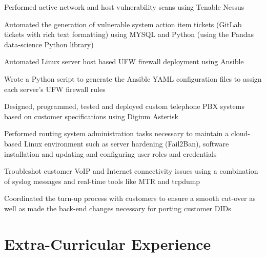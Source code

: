 \documentclass[letterpaper]{deedy-resume} %
\begin{document}
\begin{minipage}[t]{0.66\textwidth}
\sectionspace %



\begin{tightitemize}
\item Performed active network and host vulnerability scans using Tenable Nessus
\item Automated the generation of vulnerable system action item tickets (GitLab tickets with rich text formatting) using MYSQL and Python (using the Pandas data-science Python library)
\item Automated Linux server host based UFW firewall deployment using Ansible
\item Wrote a Python script to generate the Ansible YAML configuration files to assign each server’s UFW firewall rules
\end{tightitemize}

\sectionspace %


\begin{tightitemize}
	\item Designed, programmed, tested and deployed custom telephone PBX systems based on customer specifications using Digium Asterisk
	\item Performed routing system administration tasks necessary to maintain a cloud-based Linux environment such as server hardening (Fail2Ban), software installation and updating and configuring user roles and credentials 
	\item Troubleshot customer VoIP and Internet connectivity issues using a combination of syslog messages and real-time tools like MTR and tcpdump
	\item Coordinated the turn-up process with customers to ensure a smooth cut-over as well as made the back-end changes necessary for porting customer DIDs
\end{tightitemize}

\section{Extra-Curricular Experience} 


\end{minipage}
\end{document}
